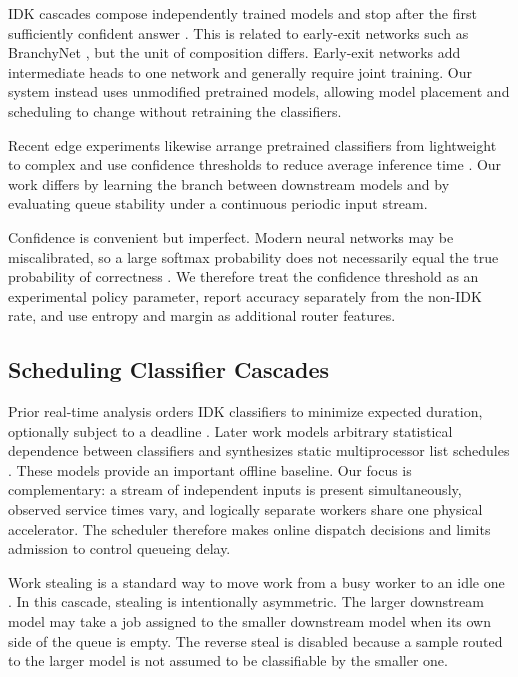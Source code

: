 IDK cascades compose independently trained models and stop after the first
sufficiently confident answer \cite{wang2018idk}.  This is related to
early-exit networks such as BranchyNet \cite{teerapittayanon2016branchynet},
but the unit of composition differs.  Early-exit networks add intermediate
heads to one network and generally require joint training.  Our system instead
uses unmodified pretrained models, allowing model placement and scheduling to
change without retraining the classifiers.

Recent edge experiments likewise arrange pretrained classifiers from
lightweight to complex and use confidence thresholds to reduce average
inference time \cite{ratul2026accuracy}.  Our work differs by learning the
branch between downstream models and by evaluating queue stability under a
continuous periodic input stream.

Confidence is convenient but imperfect.  Modern neural networks may be
miscalibrated, so a large softmax probability does not necessarily equal the
true probability of correctness \cite{guo2017calibration}.  We therefore treat
the confidence threshold as an experimental policy parameter, report accuracy
separately from the non-IDK rate, and use entropy and margin as additional
router features.

\subsection{Scheduling Classifier Cascades}

Prior real-time analysis orders IDK classifiers to minimize expected duration,
optionally subject to a deadline \cite{baruah2023ordering}.  Later work models
arbitrary statistical dependence between classifiers and synthesizes static
multiprocessor list schedules \cite{abdelzaher2023scheduling}.  These models
provide an important offline baseline.  Our focus is complementary: a stream
of independent inputs is present simultaneously, observed service times vary,
and logically separate workers share one physical accelerator.  The scheduler
therefore makes online dispatch decisions and limits admission to control
queueing delay.

Work stealing is a standard way to move work from a busy worker to an idle one
\cite{blumofe1999workstealing}.  In this cascade, stealing is intentionally
asymmetric.  The larger downstream model may take a job assigned to the smaller
downstream model when its own side of the queue is empty.  The reverse steal is
disabled because a sample routed to the larger model is not assumed to be
classifiable by the smaller one.

